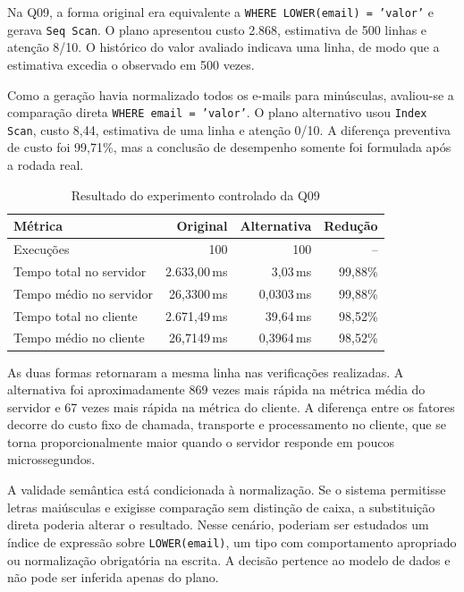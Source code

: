 \documentclass{UNESC}
\newcommand{\codigo}[1]{\texttt{#1}}
\newcommand{\ms}{\,ms}
\newcommand{\perc}{\%}
\begin{document}
Na Q09, a forma original era equivalente a \codigo{WHERE LOWER(email) = 'valor'} e gerava \codigo{Seq Scan}. O plano apresentou custo 2.868, estimativa de 500 linhas e atenção 8/10. O histórico do valor avaliado indicava uma linha, de modo que a estimativa excedia o observado em 500 vezes.

Como a geração havia normalizado todos os e-mails para minúsculas, avaliou-se a comparação direta \codigo{WHERE email = 'valor'}. O plano alternativo usou \codigo{Index Scan}, custo 8,44, estimativa de uma linha e atenção 0/10. A diferença preventiva de custo foi 99,71\perc, mas a conclusão de desempenho somente foi formulada após a rodada real.

\begin{table}[H]
\centering
\caption{Resultado do experimento controlado da Q09}
\label{tab:q09}
\small
\begin{tabularx}{\textwidth}{l r r r}
\toprule
\textbf{Métrica} & \textbf{Original} & \textbf{Alternativa} & \textbf{Redução}\\
\midrule
Execuções & 100 & 100 & --\\
Tempo total no servidor & 2.633,00\ms & 3,03\ms & 99,88\perc\\
Tempo médio no servidor & 26,3300\ms & 0,0303\ms & 99,88\perc\\
Tempo total no cliente & 2.671,49\ms & 39,64\ms & 98,52\perc\\
Tempo médio no cliente & 26,7149\ms & 0,3964\ms & 98,52\perc\\
\bottomrule
\end{tabularx}
\end{table}

As duas formas retornaram a mesma linha nas verificações realizadas. A alternativa foi aproximadamente 869 vezes mais rápida na métrica média do servidor e 67 vezes mais rápida na métrica do cliente. A diferença entre os fatores decorre do custo fixo de chamada, transporte e processamento no cliente, que se torna proporcionalmente maior quando o servidor responde em poucos microssegundos.

A validade semântica está condicionada à normalização. Se o sistema permitisse letras maiúsculas e exigisse comparação sem distinção de caixa, a substituição direta poderia alterar o resultado. Nesse cenário, poderiam ser estudados um índice de expressão sobre \codigo{LOWER(email)}, um tipo com comportamento apropriado ou normalização obrigatória na escrita. A decisão pertence ao modelo de dados e não pode ser inferida apenas do plano.
\end{document}
